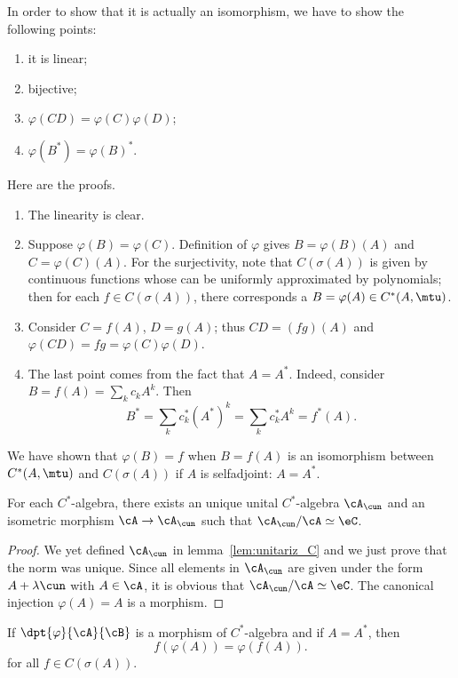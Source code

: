 In order to show that it is actually an isomorphism, we have to show the following points:
\begin{enumerate}
	\item
	      it is linear;
	\item
	      bijective;
	\item
	      $\varphi(CD)=\varphi(C)\varphi(D)$;
	\item
	      $\varphi(B^*)=\varphi(B)^*$.
\end{enumerate}
Here are the proofs.
\begin{enumerate}
	\item
	      The linearity is clear.
	\item
	      Suppose $\varphi(B)=\varphi(C)$. Definition of $\varphi$ gives $B=\varphi(B)(A)$ and $C=\varphi(C)(A)$. For the surjectivity, note that $C(\sigma(A))$ is given by continuous functions whose can be uniformly approximated by polynomials; then for each $f\in C( \sigma(A))$, there corresponds a $B=\varphi(A)\in C^*(A,\mtu)$.
	\item
	      Consider $C=f(A)$, $D=g(A)$; thus $CD=(fg)(A)$ and $\varphi(CD)=fg=\varphi(C)\varphi(D)$.
	\item
	      The last point comes from the fact that $A=A^*$. Indeed, consider $B=f(A)=\sum_k c_kA^k$. Then
	      \[
		      B^*=\sum_k c_k^*(A^*)^k=\sum_k c_k^*A^k=f^*(A).
	      \]
\end{enumerate}

We have shown that $\varphi(B)=f$ when $B=f(A)$ is an isomorphism between $C^*(A,\mtu)$ and $C(\sigma(A))$ if $A$ is selfadjoint: $A=A^*$.

\begin{corollary}
	For each $C^*$-algebra, there exists an unique unital $C^*$-algebra $\cA_{\cun}$ and an isometric morphism $\cA\to\cA_{\cun}$ such that $\cA_{\cun}/\cA\simeq\eC$.
\end{corollary}\label{cor_csa_unit}

\begin{proof}
	We yet defined $\cA_{\cun}$ in lemma~\ref{lem:unitariz_C} and we just prove that the norm was unique. Since all elements in $\cA_{\cun}$ are given under the form $A+\lambda\cun$ with $A\in\cA$, it is obvious that $\cA_{\cun}/\cA\simeq\eC$. The canonical injection $\varphi(A)=A$ is a morphism.
\end{proof}


\begin{lemma}
	If $\dpt{\varphi}{\cA}{\cB}$ is a morphism of $C^*$-algebra and if $A=A^*$, then
	\[
		f(\varphi(A))=\varphi(f(A)).
	\]
	for all $f\in C(\sigma(A))$.
\end{lemma} \label{lem:fvpvpf}



